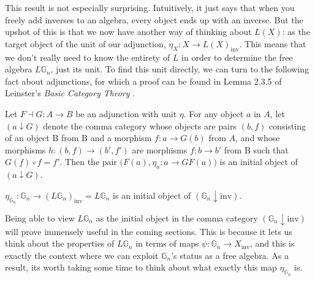 This result is not especially surprising. Intuitively, it just says that when you freely add inverses to an algebra, every object ends up with an inverse. But the upshot of this is that we now have another way of thinking about $L(X)$: as the target object of the unit of our adjunction, $\eta_X: X \to L(X)_{\mathrm{inv}}$. This means that we don't really need to know the entirety of $L$ in order to determine the free algebra $L\mathbb{G}_n$, just its unit. To find this unit directly, we can turn to the following fact about adjunctions, for which a proof can be found in Lemma 2.3.5 of Leinster's \textit{Basic Category Theory} \cite{bct}.

\begin{prop}\label{initial} Let $F \dashv G: A \to B$ be an adjunction with unit $\eta$. For any object $a$ in $A$, let $(a \downarrow G)$ denote the comma category whose objects are pairs $(b, f)$ consisting of an object $\mathrm{B}$ from $\mathrm{B}$ and a morphism $f: a \to G(b)$ from $A$, and whose morphisms $h: (b, f) \to (b', f')$ are morphisms $f: b \to b'$ from $\mathrm{B}$ such that $G(f) \circ f = f'$. Then the pair $\big(F(a), \eta_a: a \to GF(a) \big)$ is an initial object of $(a \downarrow G)$.
\end{prop}

\begin{cor} $\eta_{\mathbb{G}_n}: \mathbb{G}_n \to (L\mathbb{G}_n)_{\mathrm{inv}} = L\mathbb{G}_n$ is an initial object of $(\mathbb{G}_n \downarrow \mathrm{inv})$.
\end{cor}

Being able to view $L\mathbb{G}_n$ as the initial object in the comma category $(\mathbb{G}_n \downarrow \mathrm{inv})$ will prove immensely useful in the coming sections. This is because it lets us think about the properties of $L\mathbb{G}_n$ in terms of maps $\psi: \mathbb{G}_n \to X_{\mathrm{inv}}$, and this is exactly the context where we can exploit $\mathbb{G}_n$'s status as a free algebra. As a result, its worth taking some time to think about what exactly this map $\eta_{\mathbb{G}_n}$ is.

